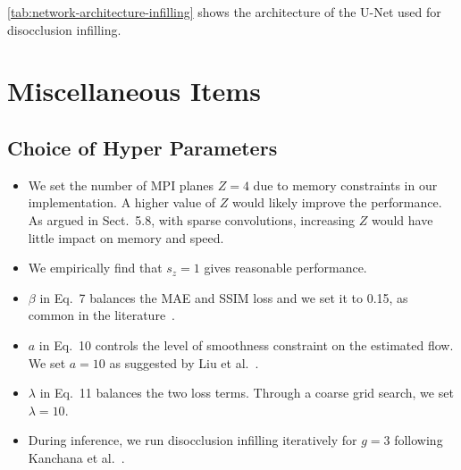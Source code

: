 \documentclass[preprint]{vgtc}
\def\etal{et al.}
\begin{document}
    \autoref{tab:network-architecture-infilling} shows the architecture of the U-Net used for disocclusion infilling.


    \section{Miscellaneous Items}\label{sec:misc}
    \subsection{Choice of Hyper Parameters}
    \begin{itemize}
        \item We set the number of MPI planes $Z = 4$ due to memory constraints in our implementation.
        A higher value of $Z$ would likely improve the performance.
        As argued in Sect.\ 5.8, with sparse convolutions, increasing $Z$ would have little impact on memory and speed.
        \item We empirically find that $s_z = 1$ gives reasonable performance.
        \item $\beta$ in Eq.\ 7 balances the MAE and SSIM loss and we set it to 0.15, as common in the literature~\cite{godard2017unsupervised}.
        \item $a$ in Eq.\ 10 controls the level of smoothness constraint on the estimated flow.
        We set $a=10$ as suggested by Liu \etal~\cite{liu2020arflow}.
        \item $\lambda$ in Eq.\ 11 balances the two loss terms.
        Through a coarse grid search, we set $\lambda = 10$.
        \item During inference, we run disocclusion infilling iteratively for $g=3$ following Kanchana \etal~\cite{kanchana2022ivp}.
    \end{itemize}





\end{document}
